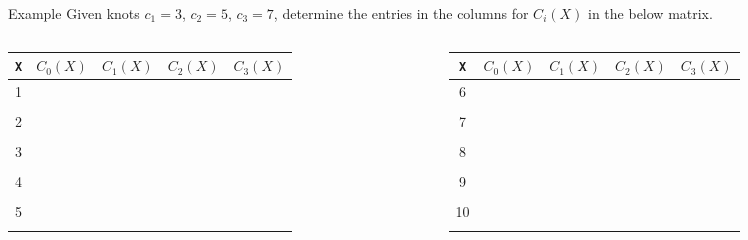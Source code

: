 \documentclass[aspectratio=169,usenames,dvipsnames]{beamer}
\begin{document}
{
\begin{frame}[t]{Example}
	Given knots $c_1 = 3$, $c_2 = 5$, $c_3 = 7$, determine the entries in the columns for $C_i(X)$ in the below matrix. 

	\vfill 
\begin{columns}
\centering
\begin{tabular}{c || c | c | c | c |}
	\texttt{X} & $C_0(X)$ &$ C_1(X)$ & $C_2(X)$ & $C_3(X)$  \\ \hline 
	1  &&&&\\ 
	&&&&\\
	2 &&&&\\ 
	&&&&\\
	3&&&& \\ 
	&&&&\\
	4&&&& \\ 
	&&&&\\
	5 &&&&\\ 
	&&&&\\
\end{tabular}


\centering

\begin{tabular}{c || c | c | c | c |}
	\texttt{X} & $C_0(X)$ &$ C_1(X)$ & $C_2(X)$ & $C_3(X)$  \\ \hline 
	6&&&&\\
	&&&&\\
	7  &&&&\\ 
	&&&&\\
	8 &&&&\\ 
	&&&&\\
	9&&&& \\ 
	&&&&\\
	10&&&& \\ 
	&&&&\\
\end{tabular}
\end{columns}
\end{frame}
}
\end{document}
